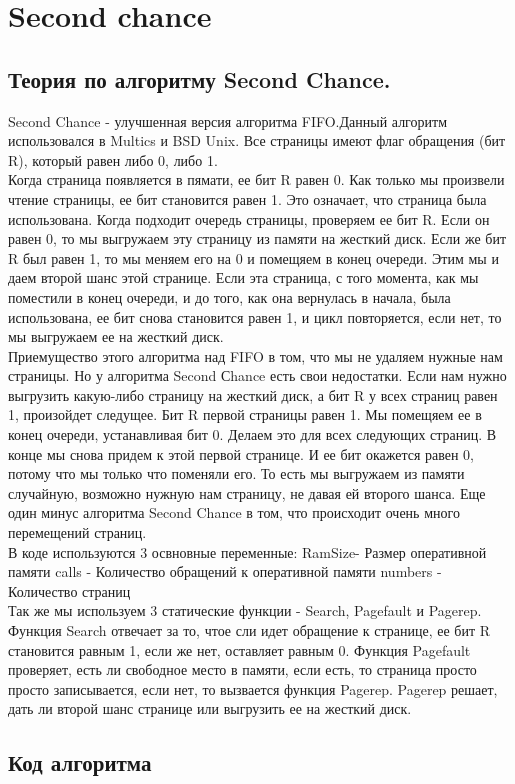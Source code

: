 \section{Second chance}

\subsection{Теория по алгоритму Second Chance.} 

Second Chance - улучшенная версия алгоритма FIFO.Данный алгоритм использовался в Multics и BSD Unix. Все страницы имеют флаг обращения (бит R), который равен либо 0, либо 1.\\
Когда страница появляется в пямати, ее бит R равен 0. Как только мы произвели чтение страницы, ее бит становится равен 1. Это означает, что страница была использована. Когда подходит очередь страницы, проверяем ее бит R. Если он равен 0, то мы выгружаем эту страницу из памяти на жесткий диск. Если же бит R был равен 1, то мы меняем его на 0 и помещяем в конец очереди. Этим мы и даем второй шанс этой странице. Если эта страница, с того момента, как мы поместили в конец очереди, и до того, как она вернулась в начала, была использована, ее бит снова становится равен 1, и цикл  повторяется, если нет, то мы выгружаем ее на жесткий диск.\\
 Приемущество этого алгоритма над FIFO в том, что мы не удаляем нужные нам страницы. Но у алгоритма Second Сhance есть свои недостатки. Если нам нужно выгрузить какую-либо страницу на жесткий диск, а бит R у всех страниц равен 1, произойдет следущее. Бит R первой страницы равен 1. Мы помещяем ее в конец очереди, устанавливая бит 0. Делаем это для всех следующих страниц. В конце мы снова придем к этой первой странице. И ее бит окажется равен 0, потому что мы только что поменяли его. То есть мы выгружаем из памяти случайную, возможно нужную нам страницу, не давая ей второго шанса. Еще один минус алгоритма Second Chance  в том, что происходит очень много перемещений страниц.\\
 В коде используются 3 освновные переменные: 
 RamSize- Размер оперативной памяти
 calls - Количество обращений к оперативной памяти
 numbers - Количество страниц\\
Так же мы используем 3 статические функции - Search, Pagefault и Pagerep. Функция Search отвечает за то, чтое сли идет обращение к странице, ее бит R становится равным 1, если же нет, оставляет равным 0. Функция Pagefault проверяет, есть ли свободное место в памяти, если есть, то страница просто просто записывается, если нет, то вызвается функция  Pagerep. Pagerep решает, дать ли второй шанс странице или выгрузить ее на жесткий диск.
 \subsection{Код алгоритма}
 